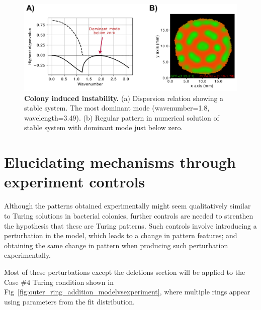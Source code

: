 \begin{figure}[H] %
    \centering
    \begin{adjustbox}{center}
        \includegraphics[width=1\textwidth]{chapters/Chapter 3/colony_induced_turing} %
    \end{adjustbox}
    \caption{\textbf{Colony induced instability.}  (a) Dispersion relation showing a stable system. The most dominant mode (wavenumber=1.8, wavelength=3.49). (b) Regular pattern in numerical solution of stable system with dominant mode just below zero.}
    \label{fig:colony_induced_turing}
\end{figure}


\section{Elucidating mechanisms through experiment controls}
Although the patterns obtained experimentally might seem qualitatively similar to Turing solutions in bacterial colonies, further controls are needed to strenthen the hypothesis that these are Turing patterns.
Such controls involve introducing a perturbation in the model, which leads to a change in pattern features; and obtaining the same change in pattern when producing such perturbation experimentally.

Most of these perturbations except the deletions section will be applied to the Case \#4 Turing condition shown in Fig~\ref{fig:outer_ring_addition_modelvsexperiment}, where multiple rings appear using parameters from the fit distribution.

